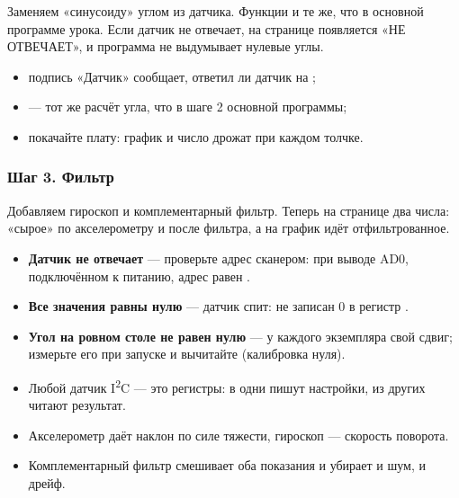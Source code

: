 Заменяем «синусоиду» углом из датчика. Функции  и  те же, что в основной
программе урока. Если датчик не отвечает, на странице появляется «НЕ ОТВЕЧАЕТ», и программа не выдумывает
нулевые углы.


\begin{itemize}[leftmargin=*]
  \item подпись «Датчик» сообщает, ответил ли датчик на ;
  \item {} --- тот же расчёт угла, что в шаге 2 основной программы;
  \item покачайте плату: график и число дрожат при каждом толчке.
\end{itemize}

\subsubsection{Шаг 3. Фильтр}

Добавляем гироскоп и комплементарный фильтр. Теперь на странице два числа: «сырое» по акселерометру и
после фильтра, а на график идёт отфильтрованное.


\begin{trouble}
\begin{itemize}[leftmargin=*]
  \item \textbf{Датчик не отвечает} --- проверьте адрес сканером: при выводе AD0, подключённом к питанию, адрес равен .
  \item \textbf{Все значения равны нулю} --- датчик спит: не записан 0 в регистр .
  \item \textbf{Угол на ровном столе не равен нулю} --- у каждого экземпляра свой сдвиг; измерьте его при
        запуске и вычитайте (калибровка нуля).
\end{itemize}
\end{trouble}

\begin{summary}
\begin{itemize}[leftmargin=*]
  \item Любой датчик I\textsuperscript{2}C --- это регистры: в одни пишут настройки, из других читают результат.
  \item Акселерометр даёт наклон по силе тяжести, гироскоп --- скорость поворота.
  \item Комплементарный фильтр смешивает оба показания и убирает и шум, и дрейф.
\end{itemize}
\end{summary}

